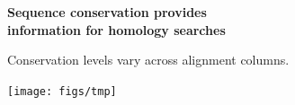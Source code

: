 \documentclass[landscape]{slides}
\begin{document}
\begin{slide}
\begin{center}
\textbf{Sequence conservation provides \\ information for homology searches}
\medskip




Conservation levels vary across alignment columns.

\texttt{[image: figs/tmp]}
\end{center}

\vfill
\end{slide}

\end{document}
